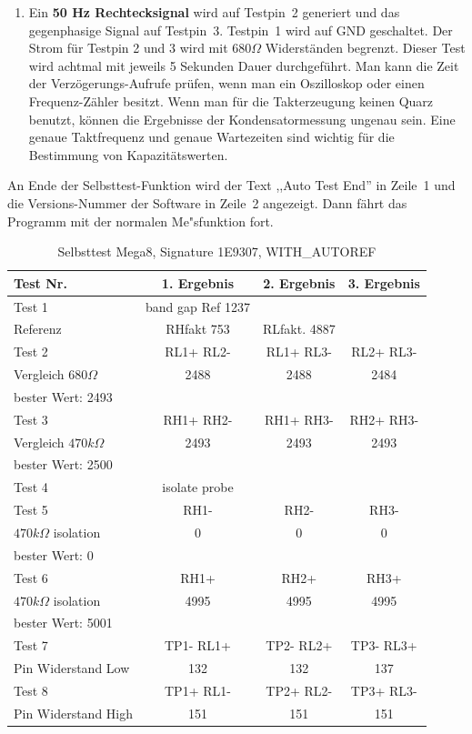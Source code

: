 \begin{enumerate}
\item Ein {\bf 50 Hz Rechtecksignal} wird auf Testpin~2 generiert und das gegenphasige Signal auf Testpin~3.
Testpin~1 wird auf GND geschaltet. Der Strom f\"ur Testpin 2 und 3 wird mit \(680\Omega\) Widerst\"anden begrenzt.
Dieser Test wird achtmal mit jeweils 5 Sekunden Dauer durchgef\"uhrt.
Man kann die Zeit der Verz\"ogerungs-Aufrufe pr\"ufen, wenn man ein Oszilloskop oder einen
Frequenz-Z\"ahler besitzt.
Wenn man f\"ur die Takterzeugung keinen Quarz benutzt, k\"onnen die
Ergebnisse der Kondensatormessung ungenau sein.
Eine genaue Taktfrequenz und genaue Wartezeiten sind wichtig f\"ur die Bestimmung von Kapazit\"atswerten.

\end{enumerate}

An Ende der Selbsttest-Funktion wird der Text ,,Auto Test End'' in Zeile~1 und die Versions-Nummer der Software in Zeile~2 angezeigt.
Dann f\"ahrt das Programm mit der normalen Me"sfunktion fort.

\begin{table}[H]
  \begin{center}
    \begin{tabular}{| l | c | c | c |}
    \hline
Test Nr. & 1. Ergebnis & 2. Ergebnis & 3. Ergebnis \\
    \hline
    \hline
Test 1 & band gap Ref  1237 &  & \\
Referenz  & RHfakt 753 & RLfakt.  4887 &  \\
    \hline
Test 2 & RL1+ RL2- & RL1+ RL3- & RL2+ RL3- \\
Vergleich \(680\Omega\) & 2488 & 2488 & 2484 \\
bester Wert: 2493 & & & \\
    \hline
Test 3 & RH1+ RH2- & RH1+ RH3- & RH2+ RH3- \\
Vergleich \(470k\Omega\) & 2493 & 2493 & 2493 \\
bester Wert: 2500 & & & \\
    \hline
Test 4 & isolate probe & & \\
    \hline
Test 5 & RH1- &  RH2- & RH3- \\
\(470k\Omega\) isolation & 0 & 0 & 0 \\
bester Wert: 0 & & & \\
    \hline
Test 6 & RH1+ & RH2+ & RH3+ \\
\(470k\Omega\) isolation & 4995 & 4995 & 4995 \\
bester Wert: 5001 & & & \\
    \hline
Test 7 & TP1- RL1+ & TP2- RL2+ & TP3- RL3+ \\
Pin Widerstand Low & 132 & 132 & 137 \\
    \hline
Test 8 & TP1+ RL1- & TP2+ RL2- & TP3+ RL3- \\
Pin Widerstand High & 151 & 151 & 151 \\
    \hline
    \end{tabular}
  \end{center}
  \caption{Selbsttest Mega8, Signature 1E9307, WITH\_AUTOREF}
  \label{tab:test_m8} 
\end{table}

